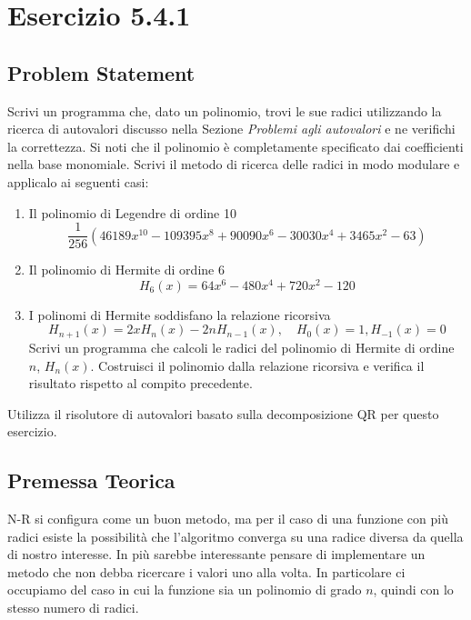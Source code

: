 \newpage


\section{Esercizio 5.4.1}
\subsection{Problem Statement}

Scrivi un programma che, dato un polinomio, trovi le sue radici utilizzando la ricerca di autovalori discusso nella Sezione \textit{Problemi agli autovalori} e ne verifichi la correttezza. Si noti che il polinomio è completamente specificato dai coefficienti nella base monomiale. Scrivi il metodo di ricerca delle radici in modo modulare e applicalo ai seguenti casi:

\begin{enumerate}
    \item Il polinomio di Legendre di ordine 10
    \[
    \frac{1}{256}(46189x^{10} - 109395x^8 + 90090x^6 - 30030x^4 + 3465x^2 - 63)
    \]
    
    \item Il polinomio di Hermite di ordine 6
    \[
    H_6(x) = 64x^6 - 480x^4 + 720x^2 - 120
    \]
    
    \item I polinomi di Hermite soddisfano la relazione ricorsiva
    \[
    H_{n+1}(x) = 2xH_n(x) - 2nH_{n-1}(x), \quad H_0(x) = 1, H_{-1}(x) = 0
    \]
    Scrivi un programma che calcoli le radici del polinomio di Hermite di ordine $n$, $H_n(x)$. Costruisci il polinomio dalla relazione ricorsiva e verifica il risultato rispetto al compito precedente.
\end{enumerate}

Utilizza il risolutore di autovalori basato sulla decomposizione QR per questo esercizio.


\subsection{Premessa Teorica}
N-R si configura come un buon metodo, ma per il caso di una funzione con più radici esiste la possibilità che l'algoritmo converga su una  radice diversa da quella di nostro interesse. In più sarebbe interessante pensare di implementare un metodo che non debba ricercare i valori uno alla volta. In particolare ci occupiamo del caso in cui la funzione sia un polinomio di grado $n$, quindi con lo stesso numero di radici.\\

